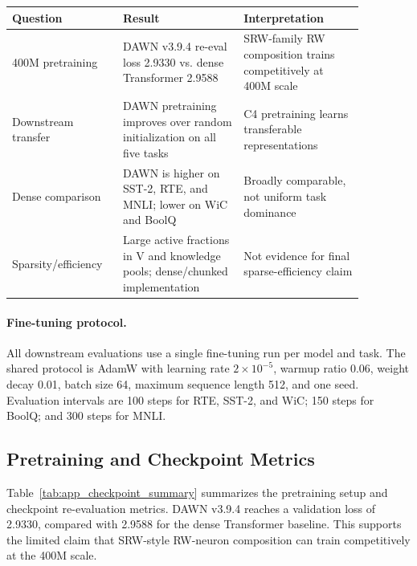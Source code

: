 \documentclass{article}
\begin{document}
\begin{center}
\small
\setlength{\tabcolsep}{4pt}
\renewcommand{\arraystretch}{1.12}
\begin{tabular}{p{0.25\linewidth}p{0.31\linewidth}p{0.31\linewidth}}
\toprule
Question & Result & Interpretation \\ 
\midrule
400M pretraining & DAWN v3.9.4 re-eval loss 2.9330 vs. dense Transformer 2.9588 & SRW-family RW composition trains competitively at 400M scale \\ 
Downstream transfer & DAWN pretraining improves over random initialization on all five tasks & C4 pretraining learns transferable representations \\ 
Dense comparison & DAWN is higher on SST-2, RTE, and MNLI; lower on WiC and BoolQ & Broadly comparable, not uniform task dominance \\ 
Sparsity/efficiency & Large active fractions in V and knowledge pools; dense/chunked implementation & Not evidence for final sparse-efficiency claim \\ 
\bottomrule
\end{tabular}
\label{tab:app_v394_pilot_summary}
\end{center}

\paragraph{Fine-tuning protocol.}
All downstream evaluations use a single fine-tuning run per model and task. The shared protocol is AdamW with learning rate $2\times 10^{-5}$, warmup ratio 0.06, weight decay 0.01, batch size 64, maximum sequence length 512, and one seed. Evaluation intervals are 100 steps for RTE, SST-2, and WiC; 150 steps for BoolQ; and 300 steps for MNLI.

\subsection{Pretraining and Checkpoint Metrics}

Table~\ref{tab:app_checkpoint_summary} summarizes the pretraining setup and checkpoint re-evaluation metrics. DAWN v3.9.4 reaches a validation loss of 2.9330, compared with 2.9588 for the dense Transformer baseline. This supports the limited claim that SRW-style RW-neuron composition can train competitively at the 400M scale.
\end{document}
